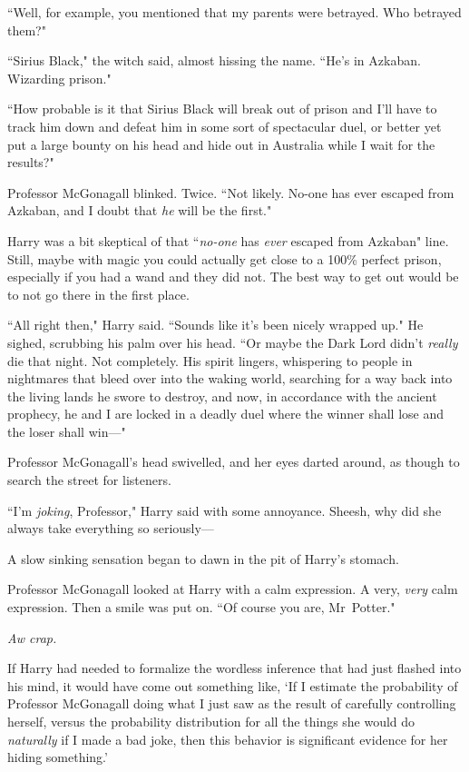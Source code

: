 ``Well, for example, you mentioned that my parents were betrayed. Who betrayed them?"

``Sirius Black," the witch said, almost hissing the name. ``He's in Azkaban. Wizarding prison."

``How probable is it that Sirius Black will break out of prison and I'll have to track him down and defeat him in some sort of spectacular duel, or better yet put a large bounty on his head and hide out in Australia while I wait for the results?"

Professor McGonagall blinked. Twice. ``Not likely. No-one has ever escaped from Azkaban, and I doubt that \emph{he} will be the first."

Harry was a bit skeptical of that ``\emph{no-one} has \emph{ever} escaped from Azkaban" line. Still, maybe with magic you could actually get close to a 100\% perfect prison, especially if you had a wand and they did not. The best way to get out would be to not go there in the first place.

``All right then," Harry said. ``Sounds like it's been nicely wrapped up." He sighed, scrubbing his palm over his head. ``Or maybe the Dark Lord didn't \emph{really} die that night. Not completely. His spirit lingers, whispering to people in nightmares that bleed over into the waking world, searching for a way back into the living lands he swore to destroy, and now, in accordance with the ancient prophecy, he and I are locked in a deadly duel where the winner shall lose and the loser shall win—"

Professor McGonagall's head swivelled, and her eyes darted around, as though to search the street for listeners.

``I'm \emph{joking}, Professor," Harry said with some annoyance. Sheesh, why did she always take everything so seriously—

A slow sinking sensation began to dawn in the pit of Harry's stomach.

Professor McGonagall looked at Harry with a calm expression. A very, \emph{very} calm expression. Then a smile was put on. ``Of course you are, Mr~Potter."

\emph{Aw crap.}

If Harry had needed to formalize the wordless inference that had just flashed into his mind, it would have come out something like, `If I estimate the probability of Professor McGonagall doing what I just saw as the result of carefully controlling herself, versus the probability distribution for all the things she would do \emph{naturally} if I made a bad joke, then this behavior is significant evidence for her hiding something.'

